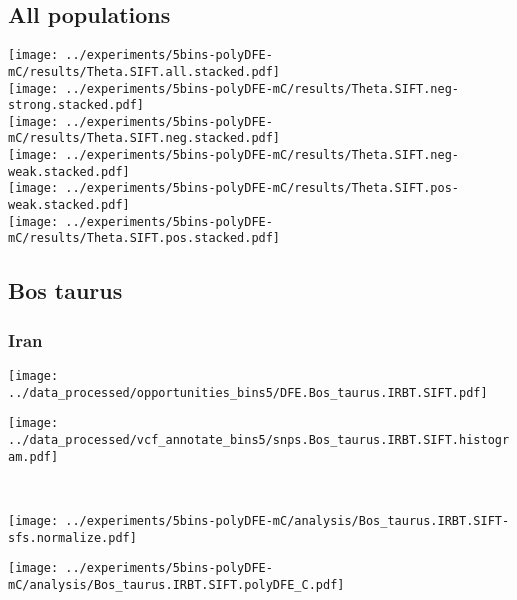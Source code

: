 \subsection{All populations}
\begin{center}
    \texttt{[image: ../experiments/5bins-polyDFE-mC/results/Theta.SIFT.all.stacked.pdf]} \\
    \texttt{[image: ../experiments/5bins-polyDFE-mC/results/Theta.SIFT.neg-strong.stacked.pdf]} \\
    \texttt{[image: ../experiments/5bins-polyDFE-mC/results/Theta.SIFT.neg.stacked.pdf]} \\
    \texttt{[image: ../experiments/5bins-polyDFE-mC/results/Theta.SIFT.neg-weak.stacked.pdf]} \\
    \texttt{[image: ../experiments/5bins-polyDFE-mC/results/Theta.SIFT.pos-weak.stacked.pdf]} \\
    \texttt{[image: ../experiments/5bins-polyDFE-mC/results/Theta.SIFT.pos.stacked.pdf]}
\end{center}

\subsection{Bos taurus}

\subsubsection{Iran}

\begin{minipage}{0.49\linewidth}
    \texttt{[image: ../data\_processed/opportunities\_bins5/DFE.Bos\_taurus.IRBT.SIFT.pdf]}
\end{minipage}
\begin{minipage}{0.49\linewidth}
    \texttt{[image: ../data\_processed/vcf\_annotate\_bins5/snps.Bos\_taurus.IRBT.SIFT.histogram.pdf]}
\end{minipage}
\\
\begin{minipage}{0.49\linewidth}
    \texttt{[image: ../experiments/5bins-polyDFE-mC/analysis/Bos\_taurus.IRBT.SIFT-sfs.normalize.pdf]}
\end{minipage}
\begin{minipage}{0.49\linewidth}
    \texttt{[image: ../experiments/5bins-polyDFE-mC/analysis/Bos\_taurus.IRBT.SIFT.polyDFE\_C.pdf]}
\end{minipage}
\\

